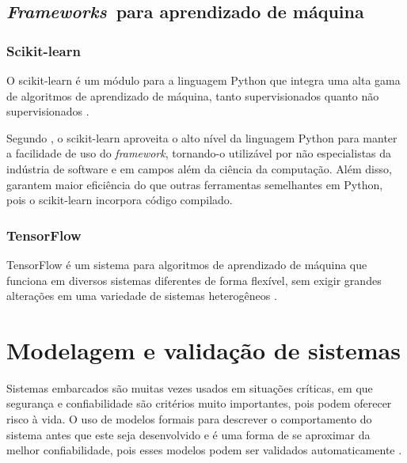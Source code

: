 \subsection{\textit{Frameworks}\ para aprendizado de máquina}
\label{sec:ml_frameworks}

\subsubsection{Scikit-learn}
\label{sec:ml_sklearn}

O scikit-learn é um módulo para a linguagem Python que integra uma alta gama de algoritmos de aprendizado de máquina, tanto supervisionados quanto não supervisionados \cite{pedregosa:2011}.

Segundo , o scikit-learn aproveita o alto nível da linguagem Python para manter a facilidade de uso do \textit{framework}, tornando-o utilizável por não especialistas da indústria de software e em campos além da ciência da computação. Além disso,  garantem maior eficiência do que outras ferramentas semelhantes em Python, pois o scikit-learn incorpora código compilado.

\subsubsection{TensorFlow}
\label{sec:ml_tf}
TensorFlow é um sistema para algoritmos de aprendizado de máquina que funciona em diversos sistemas diferentes de forma flexível, sem exigir grandes alterações em uma variedade de sistemas heterogêneos \cite{abadi:2016}.

\section{Modelagem e validação de sistemas}
\label{sec:modelosformais}
Sistemas embarcados são muitas vezes usados em situações críticas, em que segurança e confiabilidade são critérios muito importantes, pois podem oferecer risco à vida. O uso de modelos formais para descrever o comportamento do sistema antes que este seja desenvolvido e é uma forma de se aproximar da melhor confiabilidade, pois esses modelos podem ser validados automaticamente \cite{edwards:1997}.

